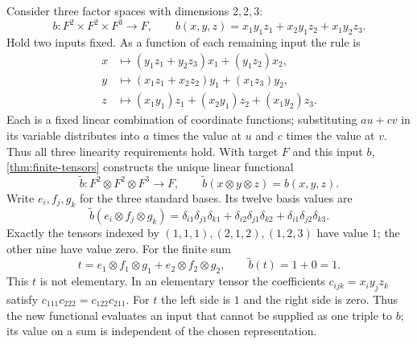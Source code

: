 \begin{example}\label{ex:three-factor-functional}
Consider three factor spaces with dimensions $2,2,3$:
\[
b:F^2\times F^2\times F^3\to F,\qquad
b(x,y,z)=x_1y_1z_1+x_2y_1z_2+x_1y_2z_3.
\]
Hold two inputs fixed. As a function of each remaining input the rule is
\begin{align*}
x&\longmapsto (y_1z_1+y_2z_3)x_1+(y_1z_2)x_2,\\
y&\longmapsto (x_1z_1+x_2z_2)y_1+(x_1z_3)y_2,\\
z&\longmapsto (x_1y_1)z_1+(x_2y_1)z_2+(x_1y_2)z_3.
\end{align*}
Each is a fixed linear combination of coordinate functions; substituting
$au+cv$ in its variable distributes into $a$ times the value at $u$ and
$c$ times the value at $v$. Thus all three linearity requirements hold.
With target $F$ and this input $b$, \cref{thm:finite-tensors} constructs
the unique linear functional
\[
\widetilde b:F^2\otimes F^2\otimes F^3\to F,
\qquad \widetilde b(x\otimes y\otimes z)=b(x,y,z).
\]
Write $e_i,f_j,g_k$ for the three standard bases. Its twelve basis values are
\[
\widetilde b(e_i\otimes f_j\otimes g_k)
=\delta_{i1}\delta_{j1}\delta_{k1}
+\delta_{i2}\delta_{j1}\delta_{k2}
+\delta_{i1}\delta_{j2}\delta_{k3}.
\]
Exactly the tensors indexed by $(1,1,1),(2,1,2),(1,2,3)$ have value $1$;
the other nine have value zero. For the finite sum
\[
t=e_1\otimes f_1\otimes g_1+e_2\otimes f_2\otimes g_2,
\qquad \widetilde b(t)=1+0=1.
\]
This $t$ is not elementary. In an elementary tensor the coefficients
$c_{ijk}=x_iy_jz_k$ satisfy $c_{111}c_{222}=c_{122}c_{211}$.
For $t$ the left side is $1$ and the right side is zero. Thus the new
functional evaluates an input that cannot be supplied as one triple to $b$;
its value on a sum is independent of the chosen representation.
\end{example}

